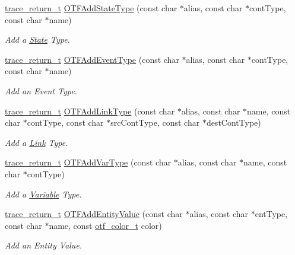 \begin{DoxyCompactItemize}
\hyperlink{group__type_ga1f1b68fb37d7331f03a48ef0993a0788}{trace\-\_\-return\-\_\-t} \hyperlink{group__cotf_gac740f7116291d76bb3afd2154a1e5962}{O\-T\-F\-Add\-State\-Type} (const char $\ast$alias, const char $\ast$cont\-Type, const char $\ast$name)
\begin{DoxyCompactList}\small\item\em Add a \hyperlink{structState}{State} Type. \end{DoxyCompactList}\item 
\hyperlink{group__type_ga1f1b68fb37d7331f03a48ef0993a0788}{trace\-\_\-return\-\_\-t} \hyperlink{group__cotf_ga655059acd582bec8ce5b38199d8b5a1e}{O\-T\-F\-Add\-Event\-Type} (const char $\ast$alias, const char $\ast$cont\-Type, const char $\ast$name)
\begin{DoxyCompactList}\small\item\em Add an Event Type. \end{DoxyCompactList}\item 
\hyperlink{group__type_ga1f1b68fb37d7331f03a48ef0993a0788}{trace\-\_\-return\-\_\-t} \hyperlink{group__cotf_gad4f12572f83d4d88c2a69807853ecf98}{O\-T\-F\-Add\-Link\-Type} (const char $\ast$alias, const char $\ast$name, const char $\ast$cont\-Type, const char $\ast$src\-Cont\-Type, const char $\ast$dest\-Cont\-Type)
\begin{DoxyCompactList}\small\item\em Add a \hyperlink{structLink}{Link} Type. \end{DoxyCompactList}\item 
\hyperlink{group__type_ga1f1b68fb37d7331f03a48ef0993a0788}{trace\-\_\-return\-\_\-t} \hyperlink{group__cotf_ga7eec321ccab983ece92ebca92887d1cf}{O\-T\-F\-Add\-Var\-Type} (const char $\ast$alias, const char $\ast$name, const char $\ast$cont\-Type)
\begin{DoxyCompactList}\small\item\em Add a \hyperlink{structVariable}{Variable} Type. \end{DoxyCompactList}\item 
\hyperlink{group__type_ga1f1b68fb37d7331f03a48ef0993a0788}{trace\-\_\-return\-\_\-t} \hyperlink{group__cotf_ga14a33c2535d2b7da582bd331993999e9}{O\-T\-F\-Add\-Entity\-Value} (const char $\ast$alias, const char $\ast$ent\-Type, const char $\ast$name, const \hyperlink{GTGOTF__Structs_8h_a5431afdab8fe4162268778e93f0950c9}{otf\-\_\-color\-\_\-t} color)
\begin{DoxyCompactList}\small\item\em Add an Entity Value. \end{DoxyCompactList}\item 

\end{DoxyCompactItemize}
